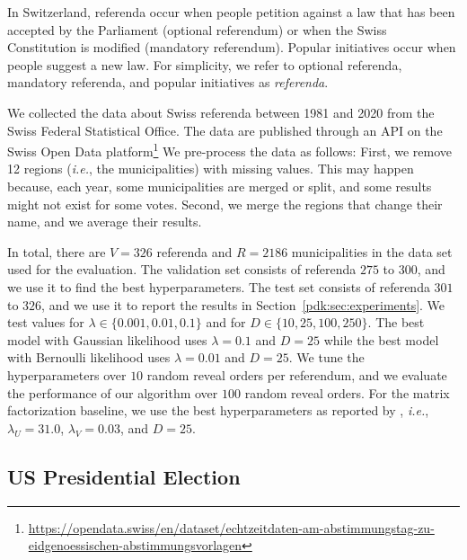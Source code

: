 In Switzerland, referenda occur when  people petition against a law that has been accepted by the Parliament (optional referendum) or when the Swiss Constitution is modified (mandatory referendum).
Popular initiatives occur when  people suggest a new law.
For simplicity, we refer to optional referenda, mandatory referenda, and popular initiatives as \textit{referenda}.

We collected the data about Swiss referenda between 1981 and 2020 from the Swiss Federal Statistical Office.
The data are published through an API on the Swiss Open Data platform\footnote{\url{https://opendata.swiss/en/dataset/echtzeitdaten-am-abstimmungstag-zu-eidgenoessischen-abstimmungsvorlagen}}
We pre-process the data as follows:
First, we remove 12 regions (\textit{i.e.}, the municipalities) with missing values.
This may happen because, each year, some municipalities are merged or split, and some results might not exist for some votes.
Second, we merge the regions that change their name, and we average their results.

In total, there are $V=326$ referenda and $R=2186$ municipalities in the data set used for the evaluation.
The validation set consists of referenda $275$ to $300$, and we use it to find the best hyperparameters.
The test set consists of referenda $301$ to $326$, and we use it to report the results in Section~\ref{pdk:sec:experiments}.
We test values for $\lambda \in \{0.001, 0.01, 0.1\}$ and for $D \in \{10, 25, 100, 250\}$.
The best model with Gaussian likelihood uses $\lambda=0.1$ and $D=25$ while the best model with Bernoulli likelihood uses $\lambda=0.01$ and $D=25$.
We tune the hyperparameters over $10$ random reveal orders per referendum, and we evaluate the performance of our algorithm over $100$ random reveal orders.
For the matrix factorization baseline, we use the best hyperparameters as reported by \citet{etter2016online}, \textit{i.e.}, $\lambda_U = 31.0$, $\lambda_V = 0.03$, and $D = 25$.

\subsection{US Presidential Election}%
\label{app:us}

